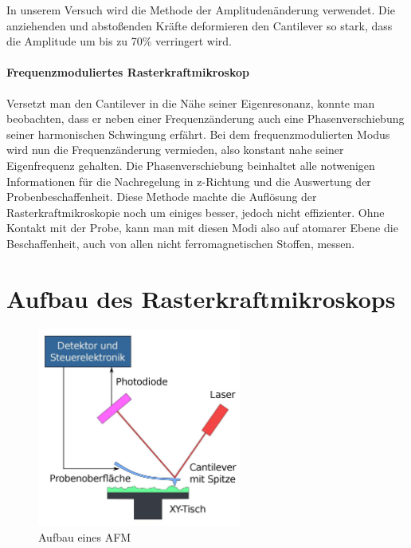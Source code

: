  In unserem Versuch wird die Methode der Amplitudenänderung verwendet. 
Die anziehenden und abstoßenden Kräfte deformieren den Cantilever so stark, dass die Amplitude um bis zu 70\% verringert wird.


       \paragraph{Frequenzmoduliertes Rasterkraftmikroskop}
       
Versetzt man den Cantilever in die Nähe seiner Eigenresonanz, konnte man beobachten, dass er neben einer Frequenzänderung auch eine Phasenverschiebung seiner harmonischen Schwingung erfährt.
Bei dem frequenzmodulierten Modus wird nun die Frequenzänderung vermieden, also konstant nahe seiner Eigenfrequenz gehalten.
Die Phasenverschiebung beinhaltet alle notwenigen Informationen für die Nachregelung in z-Richtung und die Auswertung der Probenbeschaffenheit.
Diese Methode machte die Auflösung der Rasterkraftmikroskopie noch um einiges besser, jedoch nicht effizienter.
Ohne Kontakt mit der Probe, kann man mit diesen Modi also auf atomarer Ebene die Beschaffenheit, auch von allen nicht ferromagnetischen Stoffen, messen.
 






       
 \section{Aufbau des Rasterkraftmikroskops}
\begin{figure}[h!]
    \centering
    \includegraphics[width=0.6\textwidth]{Abb/afm.jpg}
    \caption{Aufbau eines AFM}
    \label{afm}
\end{figure}

